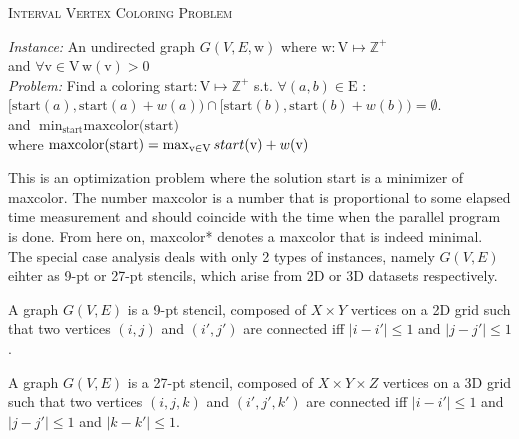 \documentclass[sigconf]{acmart}
\begin{document}
\begin{mdframed}[linecolor=black, linewidth=0.6pt, innerbottommargin=3pt, innertopmargin=3pt]
  
  \begin{Large}
    \textsc{Interval Vertex Coloring Problem}
  \end{Large}
    
  \begin{singlespace}
    \noindent \textit{Instance:} An undirected graph $G(V,E,\mathrm{w})$ where $ \mathrm{w} : \mathrm{V} \mapsto \mathbb{Z^+}$ \\
      and $\forall \mathrm{v} \in \mathrm{V} \, \mathrm{w(v)} > 0$ \\
      \textit{Problem:} Find a coloring $\text{start}:\mathrm{V} \mapsto \mathbb{Z}^+$ s.t. $\forall (a,b) \in \mathrm{E}$ :\\
      $[\text{start}(a), \text{start}(a) + w(a)) \cap [\text{start}(b), \text{start}(b) + w(b)) = \emptyset.$\\
      and $\min_{\text{start}} \text{maxcolor(start)}$ \\
      where $\text{maxcolor(start)} = \max_{\mathrm{v} \in \mathrm{V}} start(\mathrm{v}) + w(\mathrm{v}) \hspace{0.25cm}$
  \end{singlespace}
\end{mdframed}
\null
\noindent This is an optimization problem where the solution start is a minimizer of maxcolor.
The number maxcolor is a number that is proportional to some elapsed time measurement and should
coincide with the time when the parallel program is done. From here on, maxcolor* denotes a maxcolor that is
indeed minimal.\\

\noindent The special case analysis deals with only 2 types of instances, namely $G(V,E)$ eihter as 9-pt or
27-pt stencils, which arise from 2D or 3D datasets respectively.

\begin{definition}
  A graph $G(V,E)$ is a 9-pt stencil, composed of $X \times Y$ vertices on a 2D grid such that 
  two vertices $(i, j)$ and $(i', j')$ are connected iff $|i - i'| \leq 1$ and $|j - j'| \leq 1$.
\end{definition}

\begin{definition}
  A graph $G(V,E)$ is a 27-pt stencil, composed of $X \times Y \times Z$ vertices on a 3D grid such that 
  two vertices $(i, j, k)$ and $(i', j', k')$ are connected iff 
  $|i - i'| \leq 1$ and $|j - j'| \leq 1$ and $|k - k'| \leq 1$.
\end{definition}
\end{document}
